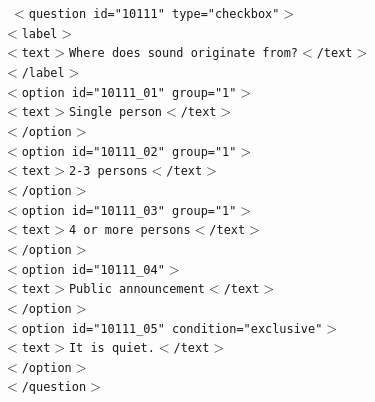 \documentclass[11pt,a4paper,titlepage]{article}
\begin{document}
\begin{center}
	\begin{tcolorbox}[colback=black!10!white,colframe=black!50!white, boxsep=1pt,left=4pt,right=4pt,top=4pt,bottom=2pt]
		\texttt{\noindent
			$<$question id="10111" type="checkbox"$>$\\
			\hspace*{0.5cm}$<$label$>$\\
			\hspace*{1cm}$<$text$>$Where does sound originate from?$<$/text$>$\\
			\hspace*{0.5cm}$<$/label$>$\\
			\hspace*{0.5cm}$<$option id="10111\_01" group="1"$>$\\
			\hspace*{1cm}$<$text$>$Single person$<$/text$>$\\
			\hspace*{0.5cm}$<$/option$>$\\
			\hspace*{0.5cm}$<$option id="10111\_02" group="1"$>$\\
			\hspace*{1cm}$<$text$>$2-3 persons$<$/text$>$\\
			\hspace*{0.5cm}$<$/option$>$\\
			\hspace*{0.5cm}$<$option id="10111\_03" group="1"$>$\\
			\hspace*{1cm}$<$text$>$4 or more persons$<$/text$>$\\
			\hspace*{0.5cm}$<$/option$>$\\
			\hspace*{0.5cm}$<$option id="10111\_04"$>$\\
			\hspace*{1cm}$<$text$>$Public announcement$<$/text$>$\\
			\hspace*{0.5cm}$<$/option$>$\\
			\hspace*{0.5cm}$<$option id="10111\_05" condition="exclusive"$>$\\
			\hspace*{1cm}$<$text$>$It is quiet.$<$/text$>$\\
			\hspace*{0.5cm}$<$/option$>$\\
			$<$/question$>$
		}
	\end{tcolorbox}
\end{center}
\end{document}
